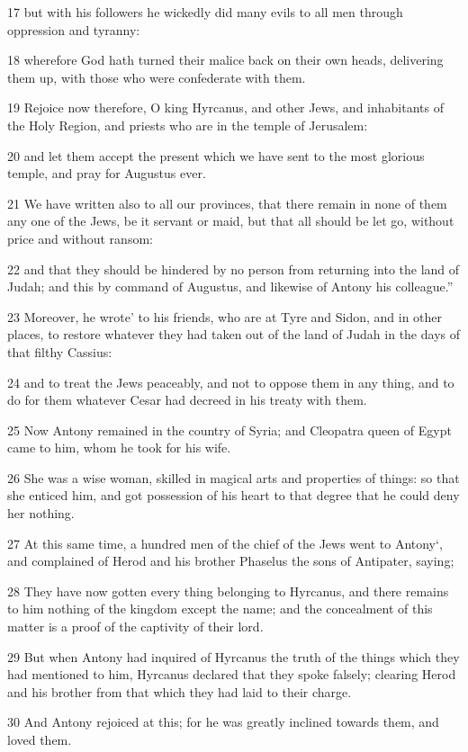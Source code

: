 17 but with his followers he wickedly did many evils to all men through oppression and tyranny: 

18 wherefore God hath turned their malice back on their own heads, delivering them up, with those who were confederate with them. 

19 Rejoice now therefore, O king Hyrcanus, and other Jews, and inhabitants of the Holy Region, and priests who are in the temple of Jerusalem: 

20 and let them accept the present which we have sent to the most glorious temple, and pray for Augustus ever. 

21 We have written also to all our provinces, that there remain in none of them any one of the Jews, be it servant or maid, but that all should be let go, without price and without ransom: 

22 and that they should be hindered by no person from returning into the land of Judah; and this by command of Augustus, and likewise of Antony his colleague.” 

23 Moreover, he wrote’ to his friends, who are at Tyre and Sidon, and in other places, to restore whatever they had taken out of the land of Judah in the days of that filthy Cassius: 

24 and to treat the Jews peaceably, and not to oppose them in any thing, and to do for them whatever Cesar had decreed in his treaty with them. 

25 Now Antony remained in the country of Syria; and Cleopatra queen of Egypt came to him, whom he took for his wife. 

26 She was a wise woman, skilled in magical arts and properties of things: so that she enticed him, and got possession of his heart to that degree that he could deny her nothing. 

27 At this same time, a hundred men of the chief of the Jews went to Antony‘, and complained of Herod and his brother Phaselus the sons of Antipater, saying; 

28 They have now gotten every thing belonging to Hyrcanus, and there remains to him nothing of the kingdom except the name; and the concealment of this matter is a proof of the captivity of their lord. 

29 But when Antony had inquired of Hyrcanus the truth of the things which they had mentioned to him, Hyrcanus declared that they spoke falsely; clearing Herod and his brother from that which they had laid to their charge. 

30 And Antony rejoiced at this; for he was greatly inclined towards them, and loved them. 

